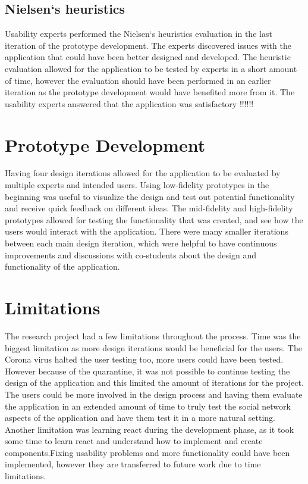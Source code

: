 \subsection{Nielsen`s heuristics}
Usability experts performed the Nielsen`s heuristics evaluation in the last iteration of the prototype development.  The experts discovered issues with the application that could have been better designed and developed.  The heuristic evaluation allowed for the application to be tested by experts in a short amount of time, however the evaluation should have been performed in an earlier iteration as the prototype development would have benefited more from it. The usability experts answered that the application was satisfactory  !!!!!!
\section{Prototype Development}
Having four design iterations allowed for the application to be evaluated by multiple experts and intended users. Using low-fidelity prototypes in the beginning was useful to visualize the design and test out potential functionality and receive quick feedback on different ideas. The mid-fidelity and high-fidelity prototypes allowed for testing the functionality that was created, and see how the users would interact with the application. There were many smaller iterations between each main design iteration, which were helpful to have continuous improvements and discussions with co-students about the design and functionality of the application. 

\section{Limitations}
The research project had a few limitations throughout the process. Time was the biggest limitation as more design iterations would be beneficial for the users. The Corona virus halted the user testing too, more users could have been tested. However because of the quarantine, it was not possible to continue testing the design of the application and this limited the amount of iterations for the project.  The users could be more involved in the design process and having them evaluate the application in an extended amount of time to truly test the social network aspects of the application and have them test it in a more natural setting. Another limitation was learning react during the development phase, as it took some time to learn react and understand how to implement and create components.Fixing usability problems and more functionality could have been implemented,  however they are transferred to future work due to time limitations. 
\newpage
